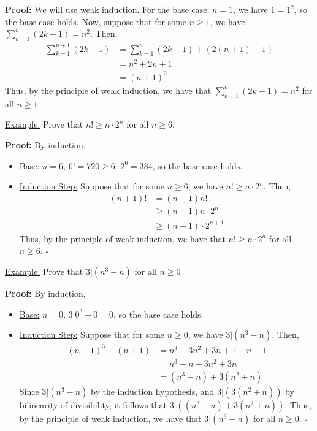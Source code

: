 \documentclass{article}
\newcommand*{\qed}{\hfill$\square$}%
\begin{document}
\textbf{Proof:} We will use weak induction. For the base case, $n=1$, we have $1=1^2$, so the base case holds. Now, suppose that for some $n\geq 1$, we have $\sum_{k=1}^n (2k-1) = n^2$. Then, \begin{align*}
    \sum_{k=1}^{n+1} (2k-1) &= \sum_{k=1}^n (2k-1) + (2(n+1)-1) \\
                             &= n^2 + 2n + 1 \\
                             &= (n+1)^2
\end{align*}Thus, by the principle of weak induction, we have that $\sum_{k=1}^n (2k-1) = n^2$ for all $n\geq 1$. \

\underline{Example:} Prove that $n!\geq n\cdot 2^n$ for all $n\geq 6$. 

\textbf{Proof:} By induction, \begin{itemize}
    \item \underline{Base:} $n=6$, $6!=720\geq 6\cdot 2^6=384$, so the base case holds.
    \item \underline{Induction Step:} Suppose that for some $n\geq 6$, we have $n!\geq n\cdot 2^n$. Then, \begin{align*}
        (n+1)! &= (n+1)n! \\
               &\geq (n+1)n\cdot 2^n \\
               &\geq (n+1)\cdot 2^{n+1}
    \end{align*}Thus, by the principle of weak induction, we have that $n!\geq n\cdot 2^n$ for all $n\geq 6$. \qed
\end{itemize}

\underline{Example:} Prove that $3|(n^3-n)$ for all $n\geq 0$

\textbf{Proof:} By induction, \begin{itemize}
    \item \underline{Base:} $n=0$, $3|0^3-0=0$, so the base case holds.
    \item \underline{Induction Step:} Suppose that for some $n\geq 0$, we have $3|(n^3-n)$. Then, \begin{align*}
        (n+1)^3-(n+1) &= n^3 + 3n^2 + 3n + 1 - n - 1 \\
                      &= n^3 - n + 3n^2 + 3n \\
                      &= (n^3 - n) + 3(n^2 + n)
    \end{align*}Since $3|(n^3-n)$ by the induction hypothesis, and $3|(3(n^2+n))$ by bilinearity of divisibility, it follows that $3|((n^3-n) + 3(n^2+n))$. Thus, by the principle of weak induction, we have that $3|(n^3-n)$ for all $n\geq 0$. \qed
\end{itemize}
\end{document}
